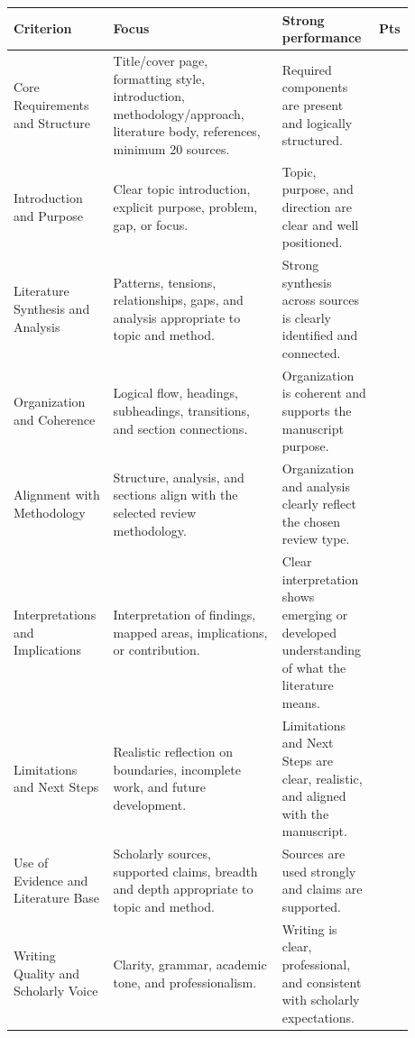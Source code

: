 \documentclass[11pt]{article}
\begin{document}
\begin{longtable}{@{}>{\raggedright\arraybackslash}p{0.22\linewidth}>{\raggedright\arraybackslash}p{0.40\linewidth}>{\raggedright\arraybackslash}p{0.22\linewidth}>{\raggedright\arraybackslash}p{0.04\linewidth}@{}}
\toprule
\textbf{Criterion} & \textbf{Focus} & \textbf{Strong performance} & \textbf{Pts} \\
\midrule
Core Requirements and Structure & Title/cover page, formatting style, introduction, methodology/approach, literature body, references, minimum 20 sources. & Required components are present and logically structured. & 8 \\
\midrule
Introduction and Purpose & Clear topic introduction, explicit purpose, problem, gap, or focus. & Topic, purpose, and direction are clear and well positioned. & 6 \\
\midrule
Literature Synthesis and Analysis & Patterns, tensions, relationships, gaps, and analysis appropriate to topic and method. & Strong synthesis across sources is clearly identified and connected. & 10 \\
\midrule
Organization and Coherence & Logical flow, headings, subheadings, transitions, and section connections. & Organization is coherent and supports the manuscript purpose. & 6 \\
\midrule
Alignment with Methodology & Structure, analysis, and sections align with the selected review methodology. & Organization and analysis clearly reflect the chosen review type. & 6 \\
\midrule
Interpretations and Implications & Interpretation of findings, mapped areas, implications, or contribution. & Clear interpretation shows emerging or developed understanding of what the literature means. & 5 \\
\midrule
Limitations and Next Steps & Realistic reflection on boundaries, incomplete work, and future development. & Limitations and Next Steps are clear, realistic, and aligned with the manuscript. & 4 \\
\midrule
Use of Evidence and Literature Base & Scholarly sources, supported claims, breadth and depth appropriate to topic and method. & Sources are used strongly and claims are supported. & 3 \\
\midrule
Writing Quality and Scholarly Voice & Clarity, grammar, academic tone, and professionalism. & Writing is clear, professional, and consistent with scholarly expectations. & 2 \\
\bottomrule
\end{longtable}
\end{document}
